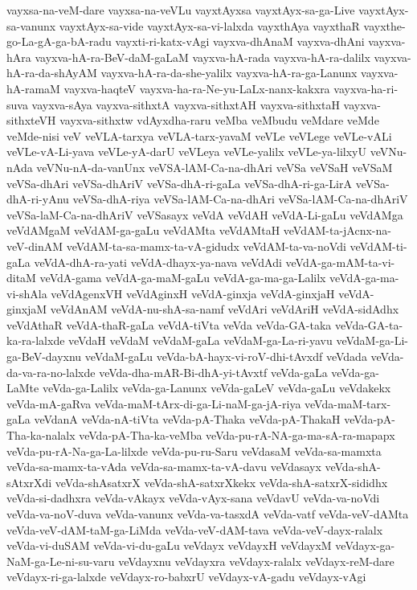 {vayxsa-na-veM-dare
vayxsa-na-veVLu
vayxtAyxsa
vayxtAyx-sa-ga-Live
vayxtAyx-sa-vanunx
vayxtAyx-sa-vide
vayxtAyx-sa-vi-lalxda
vayxthAya
vayxthaR
vayxthe-go-La-gA-ga-bA-radu
vayxti-ri-katx-vAgi
vayxva-dhAnaM
vayxva-dhAni
vayxva-hAra
vayxva-hA-ra-BeV-daM-gaLaM
vayxva-hA-rada
vayxva-hA-ra-dalilx
vayxva-hA-ra-da-shAyAM
vayxva-hA-ra-da-she-yalilx
vayxva-hA-ra-ga-Lanunx
vayxva-hA-ramaM
vayxva-haqteV
vayxva-ha-ra-Ne-yu-LaLx-nanx-kakxra
vayxva-ha-ri-suva
vayxva-sAya
vayxva-sithxtA
vayxva-sithxtAH
vayxva-sithxtaH
vayxva-sithxteVH
vayxva-sithxtw
vdAyxdha-raru
veMba
veMbudu
veMdare
veMde
veMde-nisi
veV
veVLA-tarxya
veVLA-tarx-yavaM
veVLe
veVLege
veVLe-vALi
veVLe-vA-Li-yava
veVLe-yA-darU
veVLeya
veVLe-yalilx
veVLe-ya-lilxyU
veVNu-nAda
veVNu-nA-da-vanUnx
veVSA-lAM-Ca-na-dhAri
veVSa
veVSaH
veVSaM
veVSa-dhAri
veVSa-dhAriV
veVSa-dhA-ri-gaLa
veVSa-dhA-ri-ga-LirA
veVSa-dhA-ri-yAnu
veVSa-dhA-riya
veVSa-lAM-Ca-na-dhAri
veVSa-lAM-Ca-na-dhAriV
veVSa-laM-Ca-na-dhAriV
veVSasayx
veVdA
veVdAH
veVdA-Li-gaLu
veVdAMga
veVdAMgaM
veVdAM-ga-gaLu
veVdAMta
veVdAMtaH
veVdAM-ta-jAcnx-na-veV-dinAM
veVdAM-ta-sa-mamx-ta-vA-gidudx
veVdAM-ta-va-noVdi
veVdAM-ti-gaLa
veVdA-dhA-ra-yati
veVdA-dhayx-ya-nava
veVdAdi
veVdA-ga-mAM-ta-vi-ditaM
veVdA-gama
veVdA-ga-maM-gaLu
veVdA-ga-ma-ga-Lalilx
veVdA-ga-ma-vi-shAla
veVdAgenxVH
veVdAginxH
veVdA-ginxja
veVdA-ginxjaH
veVdA-ginxjaM
veVdAnAM
veVdA-nu-shA-sa-namf
veVdAri
veVdAriH
veVdA-sidAdhx
veVdAthaR
veVdA-thaR-gaLa
veVdA-tiVta
veVda
veVda-GA-taka
veVda-GA-ta-ka-ra-lalxde
veVdaH
veVdaM
veVdaM-gaLa
veVdaM-ga-La-ri-yavu
veVdaM-ga-Li-ga-BeV-dayxnu
veVdaM-gaLu
veVda-bA-hayx-vi-roV-dhi-tAvxdf
veVdada
veVda-da-va-ra-no-lalxde
veVda-dha-mAR-Bi-dhA-yi-tAvxtf
veVda-gaLa
veVda-ga-LaMte
veVda-ga-Lalilx
veVda-ga-Lanunx
veVda-gaLeV
veVda-gaLu
veVdakekx
veVda-mA-gaRva
veVda-maM-tArx-di-ga-Li-naM-ga-jA-riya
veVda-maM-tarx-gaLa
veVdanA
veVda-nA-tiVta
veVda-pA-Thaka
veVda-pA-ThakaH
veVda-pA-Tha-ka-nalalx
veVda-pA-Tha-ka-veMba
veVda-pu-rA-NA-ga-ma-sA-ra-mapapx
veVda-pu-rA-Na-ga-La-lilxde
veVda-pu-ru-Saru
veVdasaM
veVda-sa-mamxta
veVda-sa-mamx-ta-vAda
veVda-sa-mamx-ta-vA-davu
veVdasayx
veVda-shA-sAtxrXdi
veVda-shAsatxrX
veVda-shA-satxrXkekx
veVda-shA-satxrX-sididhx
veVda-si-dadhxra
veVda-vAkayx
veVda-vAyx-sana
veVdavU
veVda-va-noVdi
veVda-va-noV-duva
veVda-vanunx
veVda-va-tasxdA
veVda-vatf
veVda-veV-dAMta
veVda-veV-dAM-taM-ga-LiMda
veVda-veV-dAM-tava
veVda-veV-dayx-ralalx
veVda-vi-duSAM
veVda-vi-du-gaLu
veVdayx
veVdayxH
veVdayxM
veVdayx-ga-NaM-ga-Le-ni-su-varu
veVdayxnu
veVdayxra
veVdayx-ralalx
veVdayx-reM-dare
veVdayx-ri-ga-lalxde
veVdayx-ro-babxrU
veVdayx-vA-gadu
veVdayx-vAgi
}
